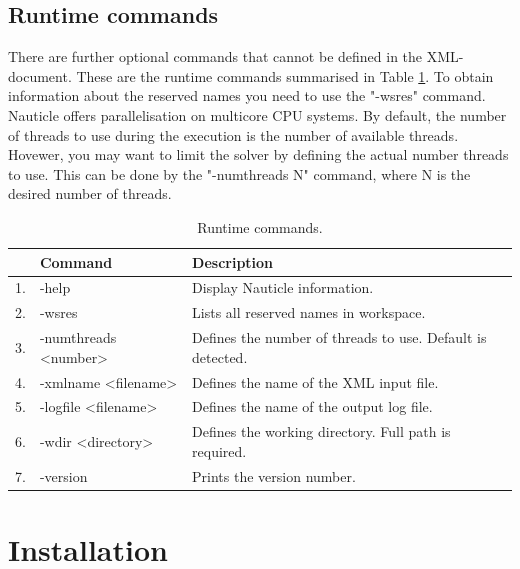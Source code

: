 \documentclass[a4paper,12pt,openany]{book}
\theoremstyle{break}
\begin{document}
\subsection{Runtime commands}
There are further optional commands that cannot be defined in the XML-document. These are the runtime commands summarised in Table \ref{tbl:runtime_commands}. To obtain information about the reserved names you need to use the "-wsres" command. Nauticle offers parallelisation on multicore CPU systems. By default, the number of threads to use during the execution is the number of available threads. Hovewer, you may want to limit the solver by defining the actual number threads to use. This can be done by the "-numthreads N" command, where N is the desired number of threads. 
\begin{table} [h]
\begin{center}
\caption{Runtime commands.} \label{tbl:runtime_commands}
\begin{tabular}{ l l l }
\toprule[1.5pt]
\bf  & \bf Command & \bf Description\\
\midrule
1. & -help & Display Nauticle information. \\
2. & -wsres & Lists all reserved names in workspace. \\
3. & -numthreads <number> & Defines the number of threads to use. Default is detected. \\
4. & -xmlname <filename> & Defines the name of the XML input file. \\
5. & -logfile <filename> & Defines the name of the output log file. \\
6. & -wdir <directory> & Defines the working directory. Full path is required. \\
7. & -version & Prints the version number. \\
\bottomrule[1.25pt]
\end{tabular}
\end{center}
\end{table}















\section{Installation}
\end{document}
